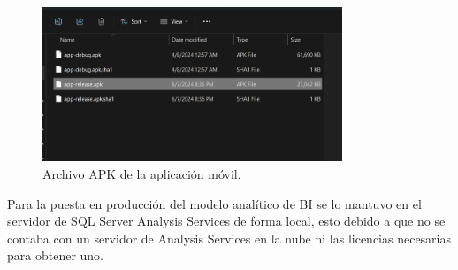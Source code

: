 \begin{figure}[H]
    \centering
    \includegraphics[width=0.8\textwidth]{chapters/III-resultados-y-discusion/resources/images/apk-movil.png}
    \caption{Archivo APK de la aplicación móvil.}
    \label{fig:apk-movil}
\end{figure}


Para la puesta en producción del modelo analítico de BI se lo mantuvo en el servidor de SQL Server Analysis Services de forma local, esto
debido a que no se contaba con un servidor de Analysis Services en la nube ni las licencias necesarias para obtener uno.
